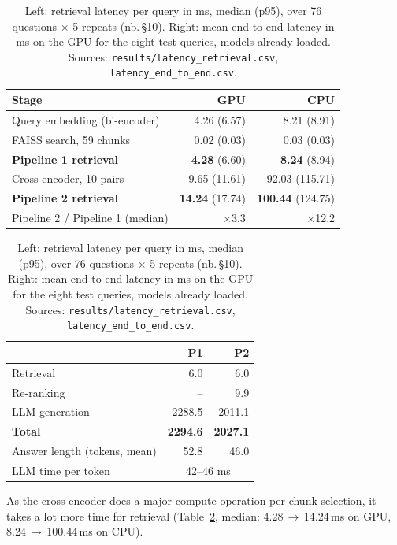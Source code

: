 \documentclass[10pt,a4paper]{article}
\newcommand{\ra}{\,$\rightarrow$\,}
\newcommand{\nb}[1]{\textcolor{inktwo}{\small(nb.\,\S#1)}}   %
\begin{document}
\begin{table}[H]
\centering\footnotesize
\caption{Left: retrieval latency per query in ms, median (p95), over 76 questions $\times$ 5 repeats \nb{10}.
Right: mean end-to-end latency in ms on the GPU for the eight test queries, models already loaded.
Sources: \texttt{results/latency\_retrieval.csv}, \texttt{latency\_end\_to\_end.csv}.}
\label{tab:latency}
\begin{tabular}[t]{@{}lrr@{}}
\toprule
Stage & GPU & CPU \\
\midrule
Query embedding (bi-encoder)          & 4.26 (6.57)  & 8.21 (8.91) \\
FAISS search, 59 chunks               & 0.02 (0.03)  & 0.03 (0.03) \\
\textcolor{pone}{\textbf{Pipeline 1 retrieval}} & \textbf{4.28} (6.60) & \textbf{8.24} (8.94) \\
Cross-encoder, 10 pairs               & 9.65 (11.61) & 92.03 (115.71) \\
\textcolor{ptwo}{\textbf{Pipeline 2 retrieval}} & \textbf{14.24} (17.74) & \textbf{100.44} (124.75) \\
\midrule
Pipeline 2 / Pipeline 1 (median)      & $\times$3.3 & $\times$12.2 \\
\bottomrule
\end{tabular}
\hspace{1em}
\begin{tabular}[t]{@{}lrr@{}}
\toprule
 & \textcolor{pone}{\textbf{P1}} & \textcolor{ptwo}{\textbf{P2}} \\
\midrule
Retrieval            & 6.0    & 6.0 \\
Re-ranking           & --     & 9.9 \\
LLM generation       & 2288.5 & 2011.1 \\
\textbf{Total}       & \textbf{2294.6} & \textbf{2027.1} \\
\midrule
Answer length (tokens, mean) & 52.8 & 46.0 \\
LLM time per token   & \multicolumn{2}{c}{42--46 ms} \\
\bottomrule
\end{tabular}
\end{table}

As the cross-encoder does a major compute operation per chunk selection, it takes a lot more time for
retrieval (Table~\ref{tab:latency}, median: 4.28\ra14.24\,ms on GPU, 8.24\ra100.44\,ms on CPU).

\end{document}
